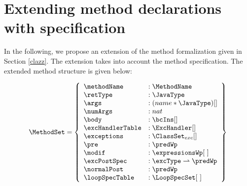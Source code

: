 \section{Extending method declarations with specification}\label{methExtend}

In the following, we propose an extension of the method formalization given in Section \ref{clazz}.
 The extension takes into account the method specification. The extended method structure is given below:

$$ \begin{array}{l} %
                     \MethodSet  = \left\{\begin{array}{ll}  
                                                          \methodName & :\MethodName\\
						          \retType & :\JavaType\\
							  \args &  : (name * \JavaType) [] \\
							  \numArgs & : nat \\
							  \body &  : \bcIns [] \\
							  \excHandlerTable & : \ExcHandler [] \\
							  \exceptions &  : \ClassSet_{exc}[] \\
							  \pre & : \predWp \\
							  \modif & :   \expressionsWp \lbrack \ \rbrack  \\
							  \excPostSpec & : \excType \rightharpoonup \predWp \\
							  \normalPost & : \predWp \\
                                                          \loopSpecTable & : \LoopSpecSet \lbrack \ \rbrack  
							  
                                     \end{array}  \right\} 
     \end{array} $$

